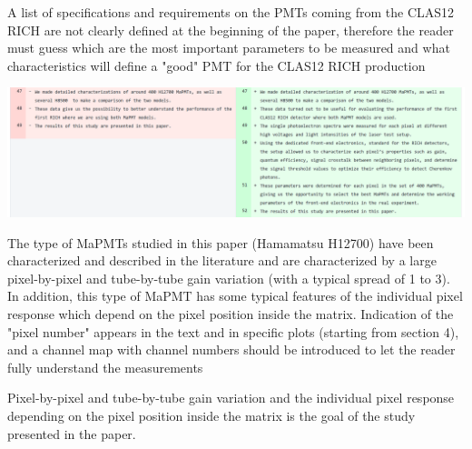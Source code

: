 \documentclass[11pt]{report}
\begin{document}
\begin{tcolorbox}[enlarge top by=2em,colbacktitle=black!60!white,colframe=black!80!white,left=0pt,right=0pt,top=0pt,bottom=0pt,boxrule=0.3pt,title=\bfseries2.02]
A list of specifications and requirements on the PMTs coming from the CLAS12 RICH are not clearly defined at the beginning of the paper, therefore the reader must guess which are the most important parameters to be measured and what characteristics will define a "good" PMT for the CLAS12 RICH production
\end{tcolorbox}


\includegraphics[width=\linewidth]{round1/2.02.png}


\begin{tcolorbox}[enlarge top by=2em,colbacktitle=black!60!white,colframe=black!80!white,left=0pt,right=0pt,top=0pt,bottom=0pt,boxrule=0.3pt,title=\bfseries2.03]
The type of MaPMTs studied in this paper (Hamamatsu H12700) have been characterized and described in the literature and are characterized by a large pixel-by-pixel and tube-by-tube gain variation (with a typical spread of 1 to 3). In addition, this type of MaPMT has some typical features of the individual pixel response which depend on the pixel position inside the matrix. Indication of the "pixel number" appears in the text and in specific plots (starting from section 4), and a channel map with channel numbers should be introduced to let the reader fully understand the measurements
\end{tcolorbox}

Pixel-by-pixel and tube-by-tube gain variation and the individual pixel response  depending on the pixel position inside the matrix is the goal of the study presented in the paper.

\end{document}
